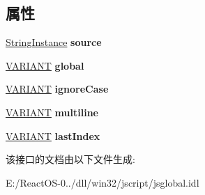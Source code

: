 \subsection*{属性}
\begin{DoxyCompactItemize}
\item 
\mbox{\label{interface_j_s_global_1_1_reg_exp_instance_a6d36daccf18f531e8de3510b7240a0b1}} 
\hyperlink{interface_j_s_global_1_1_string_instance}{String\+Instance} {\bfseries source}
\item 
\mbox{\label{interface_j_s_global_1_1_reg_exp_instance_acffe9d8b69e5357cfcbec16f8b699502}} 
\hyperlink{structtag_v_a_r_i_a_n_t}{V\+A\+R\+I\+A\+NT} {\bfseries global}
\item 
\mbox{\label{interface_j_s_global_1_1_reg_exp_instance_af0d78d8f6a93195493342b3789b7d16e}} 
\hyperlink{structtag_v_a_r_i_a_n_t}{V\+A\+R\+I\+A\+NT} {\bfseries ignore\+Case}
\item 
\mbox{\label{interface_j_s_global_1_1_reg_exp_instance_a804458f5dea413184d9fe4f063883b7d}} 
\hyperlink{structtag_v_a_r_i_a_n_t}{V\+A\+R\+I\+A\+NT} {\bfseries multiline}
\item 
\mbox{\label{interface_j_s_global_1_1_reg_exp_instance_a721ba3371b69dc50792908b763985a08}} 
\hyperlink{structtag_v_a_r_i_a_n_t}{V\+A\+R\+I\+A\+NT} {\bfseries last\+Index}
\end{DoxyCompactItemize}


该接口的文档由以下文件生成\+:\begin{DoxyCompactItemize}
\item 
E\+:/\+React\+O\+S-\/0../dll/win32/jscript/jsglobal.\+idl\end{DoxyCompactItemize}

